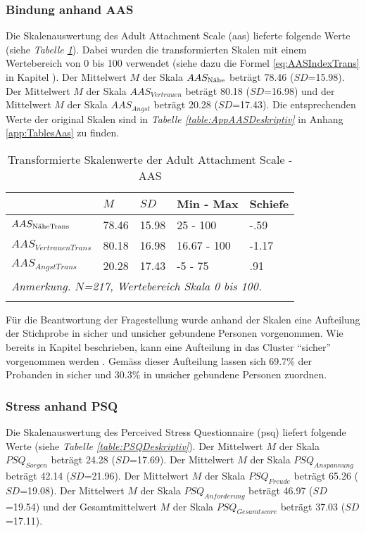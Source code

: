 \subsubsection{Bindung anhand AAS}
Die Skalenauswertung des Adult Attachment Scale (\acrshort{aas}) lieferte folgende Werte (siehe \textit{Tabelle \ref{table:AASDeskriptivTrans}}). Dabei wurden die transformierten Skalen mit einem Wertebereich von 0 bis 100 verwendet (siehe dazu die Formel \ref{eq:AASIndexTrans} in Kapitel ). Der Mittelwert $M$ der Skala $AAS_{\textnormal{Nähe}}$ beträgt 78.46 ($SD$=15.98). Der Mittelwert $M$ der Skala $AAS_{Vertrauen}$ beträgt 80.18 ($SD$=16.98) und der Mittelwert  $M$ der Skala $AAS_{Angst}$ beträgt 20.28 ($SD$=17.43). Die entsprechenden Werte der original Skalen sind in \textit{Tabelle \ref{table:AppAASDeskriptiv}} in Anhang \ref{app:TablesAas} zu finden.

\begin{table}%
\begin{tabular}{m{7em} m{3em}  m{3em}  m{5em} m{3em}} 
  \hline
  & $M$ & $SD$ & Min - Max & Schiefe\\
  \hline
  $AAS_{\textit{\textnormal{NäheTrans}}}$ & 78.46 & 15.98 & 25 - 100 & -.59\\
  $AAS_{VertrauenTrans}$ & 80.18 & 16.98 & 16.67 - 100 & -1.17\\
  $AAS_{AngstTrans}$ & 20.28 & 17.43 & -5 - 75 & .91 \\
  \hline
  \multicolumn{5}{l}{\textit{Anmerkung. $N$=217, Wertebereich Skala 0 bis 100.}}\\
  &&&&\\
\end{tabular}
\caption{Transformierte Skalenwerte der Adult Attachment Scale - AAS}
\label{table:AASDeskriptivTrans}
\end{table}

Für die Beantwortung der Fragestellung wurde anhand der Skalen eine Aufteilung der Stichprobe in sicher und unsicher gebundene Personen vorgenommen. Wie bereits in Kapitel  beschrieben, kann eine Aufteilung in das Cluster \enquote{sicher} vorgenommen werden \cite{Schuetzmann2004}. Gemäss dieser Aufteilung lassen sich 69.7\% der Probanden in sicher und 30.3\% in unsicher gebundene Personen zuordnen. 

\subsubsection{Stress anhand PSQ}
Die Skalenauswertung des Perceived Stress Questionnaire (\acrshort{psq}) liefert folgende Werte (siehe \textit{Tabelle \ref{table:PSQDeskriptiv}}). Der Mittelwert $M$ der Skala $PSQ_{Sorgen}$ beträgt 24.28 ($SD$=17.69). Der Mittelwert $M$ der Skala $PSQ_{Anspannung}$ beträgt 42.14 ($SD$=21.96). Der Mittelwert $M$ der Skala $PSQ_{Freude}$ beträgt 65.26 ($SD$=19.08). Der Mittelwert $M$ der Skala $PSQ_{Anforderung}$ beträgt 46.97 ($SD$=19.54) und der Gesamtmittelwert $M$ der Skala $PSQ_{Gesamtscore}$ beträgt 37.03 ($SD$=17.11).

